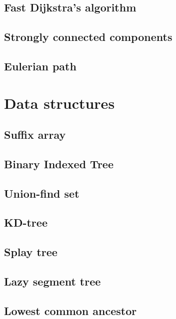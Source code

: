 \subsection{Fast Dijkstra's algorithm}
\raggedbottom
\hrulefill
\subsection{Strongly connected components}
\raggedbottom
\hrulefill
\subsection{Eulerian path}
\raggedbottom
\hrulefill

\section{Data structures}
\subsection{Suffix array}
\raggedbottom
\hrulefill
\subsection{Binary Indexed Tree}
\raggedbottom
\hrulefill
\subsection{Union-find set}
\raggedbottom
\hrulefill
\subsection{KD-tree}
\raggedbottom
\hrulefill
\subsection{Splay tree}
\raggedbottom
\hrulefill
\subsection{Lazy segment tree}
\raggedbottom
\hrulefill
\subsection{Lowest common ancestor}
\raggedbottom
\hrulefill

